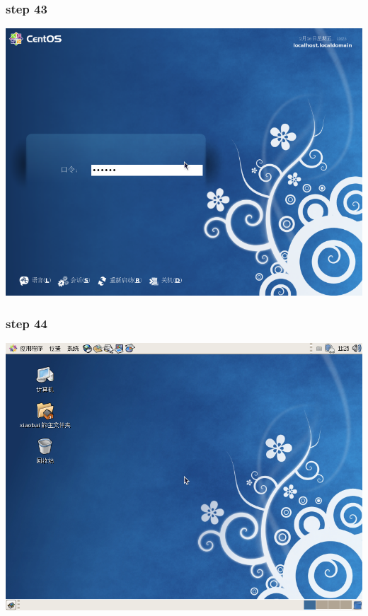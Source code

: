 \documentclass[xcolor=svgnames,presentation]{beamer}
\begin{document}
\begin{frame}
\frametitle{step 43}
\label{sec-2-43}

\begin{center}
\includegraphics[width=.9\linewidth]{img/img73.png}
\end{center}
\end{frame}
\begin{frame}
\frametitle{step 44}
\label{sec-2-44}

\begin{center}
\includegraphics[width=.9\linewidth]{img/img74.png}
\end{center}
\end{frame}
\end{document}
